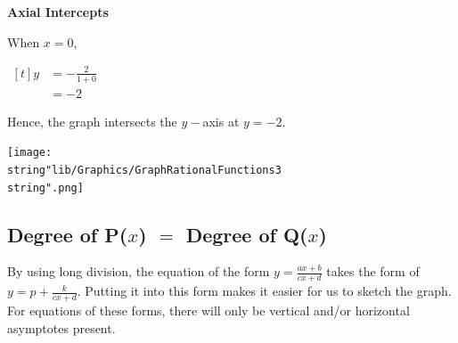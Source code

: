 \documentclass[11pt,a4paper]{book}
\begin{document}
\begin{example}{}
\textbf{Axial Intercepts}

When $x=0$,

$
\begin{aligned}[t]
y & =-\frac{2}{1+0}\\
 & =-2
\end{aligned}
$

Hence, the graph intersects the $y-$axis at $y=-2$.
\begin{center}
\texttt{[image: \\string"lib/Graphics/GraphRationalFunctions3\\string".png]}
\par\end{center}

\end{example}

\subsection{Degree of P($x$) $=$ Degree of Q($x$) }

By using long division, the equation of the form ${\displaystyle y=\frac{ax+b}{cx+d}}$
takes the form of ${\displaystyle y=p+\frac{k}{cx+d}}$. Putting it
into this form makes it easier for us to sketch the graph. For equations
of these forms, there will only be vertical and/or horizontal asymptotes
present.
\end{document}
